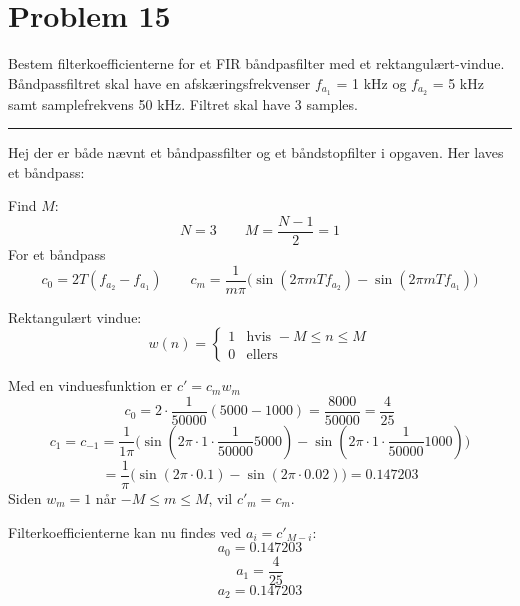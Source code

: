 \section*{Problem 15}
Bestem filterkoefficienterne for et FIR båndpasfilter med et rektangulært-vindue.
Båndpassfiltret skal have en afskæringsfrekvenser $f_{a_1}$ = 1 kHz og $f_{a_2}$ = 5 kHz samt samplefrekvens 50 kHz. 
Filtret skal have 3 samples.

\rule{\textwidth}{0.5pt}
Hej der er både nævnt et båndpassfilter og et båndstopfilter i opgaven. Her laves et båndpass:

Find $M$:
$$N=3\qquad M=\frac{N-1}{2}=1$$
For et båndpass
$$c_0=2T(f_{a_2}-f_{a_1})\qquad c_m=\frac{1}{m\pi}{\bigl(}\sin(2\pi m T f_{a_{2}})-\sin(2\pi m T f_{a_{1}}){\bigr)}$$


Rektangulært vindue:
$$w(n)=\begin{cases}
1 & \text{hvis } -M\leq n\leq M\\
0 & \text{ellers}
\end{cases}$$

Med en vinduesfunktion er $c'=c_mw_m$
$$c_0=2\cdot\frac{1}{50000}(5000-1000)=\frac{8000}{50000}=\frac{4}{25}$$
$$c_1=c_{-1}=\frac{1}{1\pi}{\bigl(}\sin(2\pi \cdot 1\cdot \frac{1}{50000} 5000)-\sin(2\pi \cdot 1\cdot \frac{1}{50000} 1000){\bigr)}$$
$$=\frac{1}{\pi}{\bigl(}\sin(2\pi \cdot  0.1)-\sin(2\pi \cdot 0.02){\bigr)}=0.147203$$
Siden $w_m=1$ når $-M\leq m \leq M$, vil $c'_m=c_m$.

Filterkoefficienterne kan nu findes ved $a_i=c'_{M-i}$:
$$a_0=0.147203$$
$$a_1=\frac{4}{25}$$
$$a_2=0.147203$$
